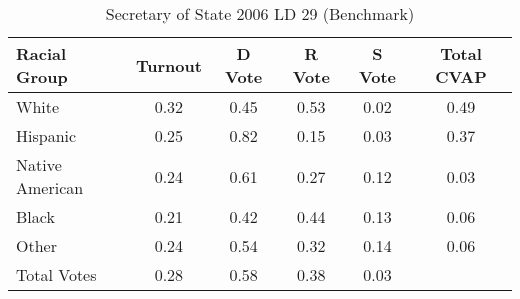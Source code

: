 \begin{table}[htb]
\begin{center}
\caption{Secretary of State 2006 LD 29 (Benchmark)}
\label{sos06_cvap_ld_29_benchmark}
\begin{tabular}{lccccc}
  \hline
Racial Group & Turnout & D Vote & R Vote & S Vote & Total CVAP \\ 
  \hline
White & 0.32 & 0.45 & 0.53 & 0.02 & 0.49 \\ 
  Hispanic & 0.25 & 0.82 & 0.15 & 0.03 & 0.37 \\ 
  Native American & 0.24 & 0.61 & 0.27 & 0.12 & 0.03 \\ 
  Black & 0.21 & 0.42 & 0.44 & 0.13 & 0.06 \\ 
  Other & 0.24 & 0.54 & 0.32 & 0.14 & 0.06 \\ 
  Total Votes & 0.28 & 0.58 & 0.38 & 0.03 &  \\ 
   \hline
\end{tabular}
\end{center}
\end{table}
